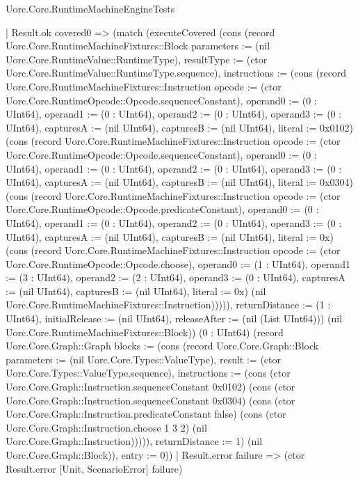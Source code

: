 \begin{lexlean}{Uorc.Core.RuntimeMachineEngineTests}
\begin{semanticmodule}
{    | Result.ok covered0 => (match (executeCovered (cons (record Uorc.Core.RuntimeMachineFixtures::Block {parameters := (nil Uorc.Core.RuntimeValue::RuntimeType), resultType := (ctor Uorc.Core.RuntimeValue::RuntimeType.sequence), instructions := (cons (record Uorc.Core.RuntimeMachineFixtures::Instruction {opcode := (ctor Uorc.Core.RuntimeOpcode::Opcode.sequenceConstant), operand0 := (0 : UInt64), operand1 := (0 : UInt64), operand2 := (0 : UInt64), operand3 := (0 : UInt64), capturesA := (nil UInt64), capturesB := (nil UInt64), literal := 0x0102}) (cons (record Uorc.Core.RuntimeMachineFixtures::Instruction {opcode := (ctor Uorc.Core.RuntimeOpcode::Opcode.sequenceConstant), operand0 := (0 : UInt64), operand1 := (0 : UInt64), operand2 := (0 : UInt64), operand3 := (0 : UInt64), capturesA := (nil UInt64), capturesB := (nil UInt64), literal := 0x0304}) (cons (record Uorc.Core.RuntimeMachineFixtures::Instruction {opcode := (ctor Uorc.Core.RuntimeOpcode::Opcode.predicateConstant), operand0 := (0 : UInt64), operand1 := (0 : UInt64), operand2 := (0 : UInt64), operand3 := (0 : UInt64), capturesA := (nil UInt64), capturesB := (nil UInt64), literal := 0x}) (cons (record Uorc.Core.RuntimeMachineFixtures::Instruction {opcode := (ctor Uorc.Core.RuntimeOpcode::Opcode.choose), operand0 := (1 : UInt64), operand1 := (3 : UInt64), operand2 := (2 : UInt64), operand3 := (0 : UInt64), capturesA := (nil UInt64), capturesB := (nil UInt64), literal := 0x}) (nil Uorc.Core.RuntimeMachineFixtures::Instruction))))), returnDistance := (1 : UInt64), initialRelease := (nil UInt64), releaseAfter := (nil (List UInt64))}) (nil Uorc.Core.RuntimeMachineFixtures::Block)) (0 : UInt64) (record Uorc.Core.Graph::Graph {blocks := (cons (record Uorc.Core.Graph::Block {parameters := (nil Uorc.Core.Types::ValueType), result := (ctor Uorc.Core.Types::ValueType.sequence), instructions := (cons (ctor Uorc.Core.Graph::Instruction.sequenceConstant 0x0102) (cons (ctor Uorc.Core.Graph::Instruction.sequenceConstant 0x0304) (cons (ctor Uorc.Core.Graph::Instruction.predicateConstant false) (cons (ctor Uorc.Core.Graph::Instruction.choose 1 3 2) (nil Uorc.Core.Graph::Instruction))))), returnDistance := 1}) (nil Uorc.Core.Graph::Block)), entry := 0}))
      | Result.error failure => (ctor Result.error [Unit, ScenarioError] failure)
}
\end{semanticmodule}
\end{lexlean}
